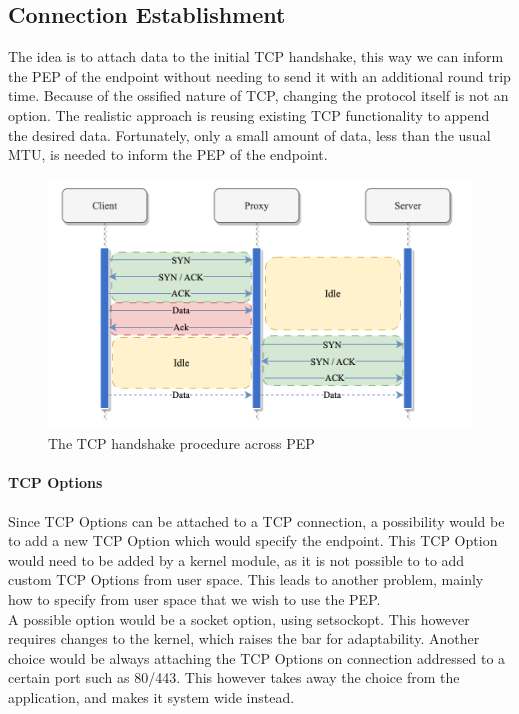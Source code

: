 \documentclass[a4paper,english, 11pt]{report}
\begin{document}
\subsection{Connection Establishment}  
The idea is to attach data to the initial TCP handshake, this way we can inform the PEP of the endpoint without needing to send it with an additional round trip time. Because of the ossified nature of TCP, changing the protocol itself is not an option. The realistic approach is reusing existing TCP functionality to append the desired data. Fortunately, only a small amount of data, less than the usual MTU, is needed to inform the PEP of the endpoint.

\begin{figure} %
	\centering
	\includegraphics[scale=0.75]{../diagrams/drawio/tcphandshake_primitiv.png}
  	\caption{The TCP handshake procedure across PEP}
  	\label{fig:tcphandshake_primitiv}
\end{figure}

\paragraph{TCP Options}
Since TCP Options can be attached to a TCP connection, a possibility would be to add a new TCP Option which would specify the endpoint. This TCP Option would need to be added by a kernel module, as it is not possible to to add custom TCP Options from user space. This leads to another problem, mainly how to specify from user space that we wish to use the PEP.\\
A possible option would be a socket option, using setsockopt. This however requires changes to the kernel, which raises the bar for adaptability. Another choice would be always attaching the TCP Options on connection addressed to a certain port such as 80/443. This however takes away the choice from the application, and makes it system wide instead.\\
\end{document}

